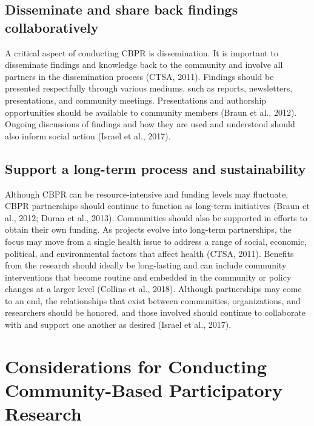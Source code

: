 \documentclass[
  11pt,
]{book}
\begin{document}
\hypertarget{disseminate-and-share-back-findings-collaboratively}{%
\subsection{Disseminate and share back findings collaboratively}\label{disseminate-and-share-back-findings-collaboratively}}

A critical aspect of conducting CBPR is dissemination. It is important to disseminate findings and knowledge back to the community and involve all partners in the dissemination process (CTSA, 2011). Findings should be presented respectfully through various mediums, such as reports, newsletters, presentations, and community meetings. Presentations and authorship opportunities should be available to community members (Braun et al., 2012). Ongoing discussions of findings and how they are used and understood should also inform social action (Israel et al., 2017).

\hypertarget{support-a-long-term-process-and-sustainability}{%
\subsection{Support a long-term process and sustainability}\label{support-a-long-term-process-and-sustainability}}

Although CBPR can be resource-intensive and funding levels may fluctuate, CBPR partnerships should continue to function as long-term initiatives (Braun et al., 2012; Duran et al., 2013). Communities should also be supported in efforts to obtain their own funding. As projects evolve into long-term partnerships, the focus may move from a single health issue to address a range of social, economic, political, and environmental factors that affect health (CTSA, 2011). Benefits from the research should ideally be long-lasting and can include community interventions that become routine and embedded in the community or policy changes at a larger level (Collins et al., 2018). Although partnerships may come to an end, the relationships that exist between communities, organizations, and researchers should be honored, and those involved should continue to collaborate with and support one another as desired (Israel et al., 2017).

\hypertarget{considerations-for-conducting-community-based-participatory-research}{%
\section{Considerations for Conducting Community-Based Participatory Research}\label{considerations-for-conducting-community-based-participatory-research}}
\end{document}
